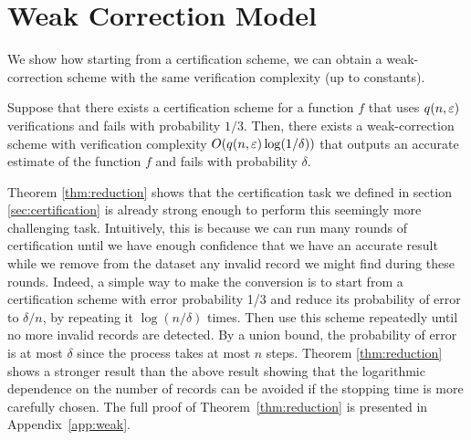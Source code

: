 \section{Weak Correction Model}
\label{sec:wcorr}

  We show how starting from a certification scheme, we can obtain a weak-correction scheme with the same verification complexity
(up to constants).

\begin{theorem}\label{thm:reduction}
    Suppose that there exists a certification scheme for a function $f$ that uses $q(n,\varepsilon)$ verifications and fails with probability $1/3$. Then,
  there exists a weak-correction scheme with verification complexity $O(q(n,\varepsilon) \log(1/\delta))$ that outputs an accurate estimate of the function
  $f$ and fails with  probability $\delta$.
\end{theorem}



  Theorem \ref{thm:reduction} shows that the certification task we defined in section \ref{sec:certification} is already strong enough to perform this
seemingly more challenging task. Intuitively, this is because we can run many rounds of certification until we have enough confidence that we have an
accurate result while we remove from the dataset any invalid record we might find during these rounds. Indeed, a simple way to make the conversion
is to start from a certification scheme with error probability 1/3 and reduce its probability of error to $\delta/n$, by repeating it $\log(n/\delta)$
times. Then use this scheme repeatedly until no more invalid records are detected. By a union bound, the probability of error is at most $\delta$ since
the process takes at most $n$ steps.
  Theorem \ref{thm:reduction} shows a stronger result than the above result showing that the logarithmic dependence on the number of records can be avoided
if the stopping time is more carefully chosen. The full proof of Theorem~\ref{thm:reduction} is presented in Appendix~\ref{app:weak}.
